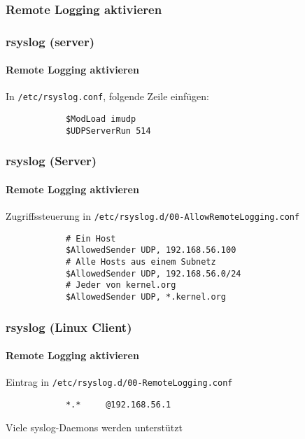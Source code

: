 \subsubsection{Remote Logging aktivieren}
\begin{frame}[fragile]
	\frametitle{rsyslog (server)}
	\framesubtitle{Remote Logging aktivieren}
	In \verb|/etc/rsyslog.conf|, folgende Zeile einfügen:
	\begin{block}{}
		\begin{verbatim}
			$ModLoad imudp
			$UDPServerRun 514
		\end{verbatim}
	\end{block}
\end{frame}
\begin{frame}[fragile]
	\frametitle{rsyslog (Server)}
	\framesubtitle{Remote Logging aktivieren}
	Zugriffssteuerung in \verb|/etc/rsyslog.d/00-AllowRemoteLogging.conf|
	\begin{block}{}
		\begin{verbatim}
			# Ein Host
			$AllowedSender UDP, 192.168.56.100
			# Alle Hosts aus einem Subnetz
			$AllowedSender UDP, 192.168.56.0/24
			# Jeder von kernel.org
			$AllowedSender UDP, *.kernel.org
		\end{verbatim}
	\end{block}
\end{frame}

\begin{frame}[fragile]
	\frametitle{rsyslog (Linux Client)}
	\framesubtitle{Remote Logging aktivieren}
	Eintrag in \verb|/etc/rsyslog.d/00-RemoteLogging.conf|
	\begin{block}{}
		\begin{verbatim}
			*.*		@192.168.56.1
		\end{verbatim}
	\end{block}
	Viele syslog-Daemons werden unterstützt
\end{frame}
